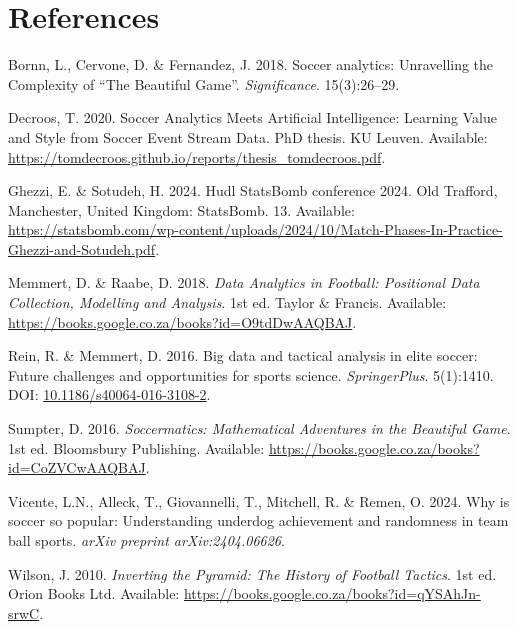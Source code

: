 \documentclass[
  a4paper,
  DIV=11,
  numbers=noendperiod,
  twoside]{scrreprt}
\newlength{\cslhangindent}
\newenvironment{CSLReferences}[2] %
 {\begin{list}{}{%
  \setlength{\itemindent}{0pt}
  \setlength{\leftmargin}{0pt}
  \setlength{\parsep}{0pt}
  \ifodd #1
   \setlength{\leftmargin}{\cslhangindent}
   \setlength{\itemindent}{-1\cslhangindent}
  \fi
  \setlength{\itemsep}{#2\baselineskip}}}
 {\end{list}}
\begin{document}

\chapter*{References}\label{references}


\label{refs}
\begin{CSLReferences}{0}{0}
Bornn, L., Cervone, D. \& Fernandez, J. 2018. Soccer analytics:
{Unravelling} the {Complexity} of {``{The} {Beautiful} {Game}''}.
\emph{Significance}. 15(3):26--29.

Decroos, T. 2020. Soccer {Analytics} {Meets} {Artificial}
{Intelligence}: {Learning} {Value} and {Style} from {Soccer} {Event}
{Stream} {Data}. PhD thesis. KU Leuven. Available:
\url{https://tomdecroos.github.io/reports/thesis_tomdecroos.pdf}.

Ghezzi, E. \& Sotudeh, H. 2024. Hudl StatsBomb conference 2024. Old
Trafford, Manchester, United Kingdom: StatsBomb. 13. Available:
\url{https://statsbomb.com/wp-content/uploads/2024/10/Match-Phases-In-Practice-Ghezzi-and-Sotudeh.pdf}.

Memmert, D. \& Raabe, D. 2018. \emph{Data {Analytics} in {Football}:
{Positional} {Data} {Collection}, {Modelling} and {Analysis}}. 1st ed.
Taylor \& Francis. Available:
\url{https://books.google.co.za/books?id=O9tdDwAAQBAJ}.

Rein, R. \& Memmert, D. 2016. Big data and tactical analysis in elite
soccer: Future challenges and opportunities for sports science.
\emph{SpringerPlus}. 5(1):1410. DOI:
\href{https://doi.org/10.1186/s40064-016-3108-2}{10.1186/s40064-016-3108-2}.

Sumpter, D. 2016. \emph{Soccermatics: {Mathematical} {Adventures} in the
{Beautiful} {Game}}. 1st ed. Bloomsbury Publishing. Available:
\url{https://books.google.co.za/books?id=CoZVCwAAQBAJ}.

Vicente, L.N., Alleck, T., Giovannelli, T., Mitchell, R. \& Remen, O.
2024. Why is soccer so popular: {Understanding} underdog achievement and
randomness in team ball sports. \emph{arXiv preprint arXiv:2404.06626}.

Wilson, J. 2010. \emph{Inverting the {Pyramid}: {The} {History} of
{Football} {Tactics}}. 1st ed. Orion Books Ltd. Available:
\url{https://books.google.co.za/books?id=qYSAhJn-srwC}.

\end{CSLReferences}
\end{document}
